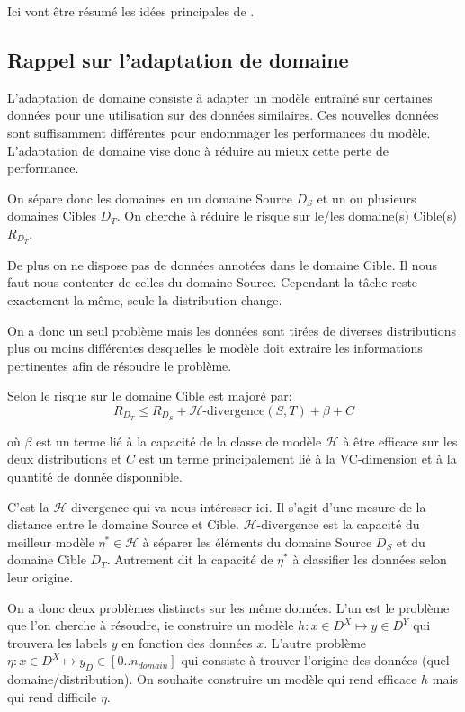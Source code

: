 Ici vont être résumé les idées principales de \cite{Ganin15}.

\subsection{Rappel sur l'adaptation de domaine} %
\label{sub:rappel}

L'adaptation de domaine consiste à adapter un modèle entraîné sur certaines
données pour une utilisation sur des données similaires.
Ces nouvelles données sont suffisamment différentes pour endommager les 
performances du modèle. L'adaptation de domaine vise donc à réduire au mieux
cette perte de performance.

On sépare donc les domaines en un domaine Source $D_S$ et un ou plusieurs domaines 
Cibles $D_T$. On cherche à réduire le risque sur le/les domaine(s) Cible(s) $R_{D_T}$.

De plus on ne dispose pas de données annotées dans le domaine Cible. Il nous faut
nous contenter de celles du domaine Source. Cependant la tâche reste exactement la
même, seule la distribution change.

On a donc un seul problème mais les données sont 
tirées de diverses distributions plus ou moins différentes desquelles le modèle
doit extraire les informations pertinentes afin de résoudre le problème.

Selon \cite{BenDavid} le risque sur le domaine Cible est majoré par:
$$ R_{D_T} \le R_{D_S} + \mathcal{H}\text{-divergence}(S,T) + \beta + C $$

où $\beta$ est un terme lié à la capacité de la classe de modèle $\mathcal{H}$
à être efficace sur les deux distributions et $C$ est un terme principalement
lié à la VC-dimension et à la quantité de donnée disponnible.

C'est la $\mathcal{H}\text{-divergence}$ qui va nous intéresser ici.
Il s'agit d'une mesure de la distance entre le domaine Source et Cible.
$\mathcal{H}\text{-divergence}$ est la capacité du meilleur modèle 
$\eta^*\in\mathcal{H}$ à séparer les éléments du domaine Source $D_S$ et du
domaine Cible $D_T$. Autrement dit la capacité de $\eta^*$ à classifier les 
données selon leur origine.

On a donc deux problèmes distincts sur les même données. L'un est le problème que 
l'on cherche à résoudre, ie construire un modèle $h: x \in D^X \mapsto y \in D^Y$
qui trouvera les labels $y$ en fonction des données $x$.
L'autre problème $\eta: x \in D^X \mapsto y_D \in [0..n_{domain}]$ qui consiste
à trouver l'origine des données (quel domaine/distribution).
On souhaite construire un modèle qui rend efficace $h$ mais qui rend 
difficile $\eta$.

